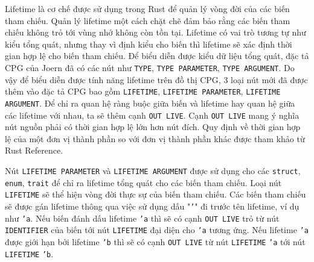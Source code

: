 Lifetime là cơ chế được sử dụng trong Rust để quản lý vòng đời của các biến tham chiếu.
Quản lý lifetime một cách chặt chẽ đảm bảo rằng các biến tham chiếu không trỏ tới vùng nhớ không còn tồn tại.
Lifetime có vai trò tương tự như kiểu tổng quát, nhưng thay vì định kiểu cho biến thì lifetime sẽ xác định thời gian hợp lệ cho biến tham chiếu.
Để biểu diễn được kiểu dữ liệu tổng quát, đặc tả CPG của Joern đã có các nút như \texttt{TYPE}, \texttt{TYPE PARAMETER}, \texttt{TYPE ARGUMENT}.
Do vậy để biểu diễn được tính năng lifetime trên đồ thị CPG, 3 loại nút mới đã được thêm vào đặc tả CPG bao gồm \texttt{LIFETIME}, \texttt{LIFETIME PARAMETER}, \texttt{LIFETIME ARGUMENT}.
Để chỉ ra quan hệ ràng buộc giữa biến và lifetime hay quan hệ giữa các lifetime với nhau, ta sẽ thêm cạnh \texttt{OUT LIVE}.
Cạnh \texttt{OUT LIVE} mang ý nghĩa nút nguồn phải có thời gian hợp lệ lớn hơn nút đích. Quy định về thời gian hợp lệ của một đơn vị thành phần so với đơn vị thành phần khác được tham khảo từ Rust Reference.

Nút \texttt{LIFETIME PARAMETER} và \texttt{LIFETIME ARGUMENT} được sử dụng cho các \texttt{struct}, \texttt{enum}, \texttt{trait} để chỉ ra lifetime tổng quát cho các biến tham chiếu.
Loại nút \texttt{LIFETIME} sẽ thể hiện vòng đời thực sự của biến tham chiếu.
Các biến tham chiếu sẽ được gán lifetime thông qua việc sử dụng dấu "\texttt{'}" đi trước tên lifetime, ví dụ như \texttt{'a}.
Nếu biến đánh dấu lifetime \texttt{'a} thì sẽ có cạnh \texttt{OUT LIVE} trỏ từ nút \texttt{IDENTIFIER} của biến tới nút \texttt{LIFETIME} đại diện cho \texttt{'a} tương ứng.
Nếu lifetime \texttt{'a} được giới hạn bởi lifetime \texttt{'b} thì sẽ có cạnh \texttt{OUT LIVE} từ nút \texttt{LIFETIME} \texttt{'a} tới nút \texttt{LIFETIME} \texttt{'b}.


